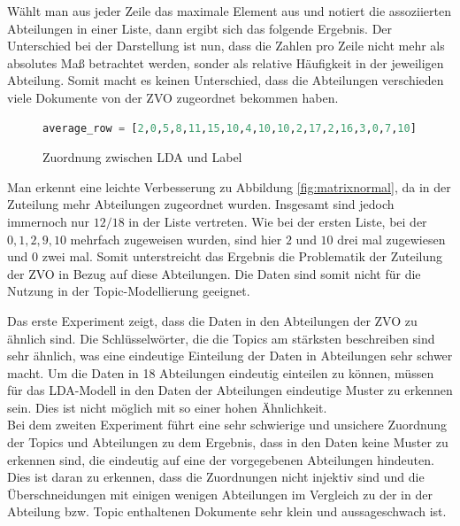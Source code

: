 \documentclass[german,version-2020-11]{uzl-thesis}
\begin{document}
Wählt man aus jeder Zeile das maximale Element aus und notiert die assoziierten Abteilungen in einer Liste, dann ergibt sich das folgende Ergebnis. Der Unterschied bei der Darstellung ist nun, dass die Zahlen pro Zeile nicht mehr als absolutes Maß betrachtet werden, sonder als relative Häufigkeit in der jeweiligen Abteilung. Somit macht es keinen Unterschied, dass die Abteilungen verschieden viele Dokumente von der ZVO zugeordnet bekommen haben. \\

\begin{figure}[h]
\begin{center}
\begin{lstlisting}[language=Python]
average_row = [2,0,5,8,11,15,10,4,10,10,2,17,2,16,3,0,7,10]
\end{lstlisting}
\caption{Zuordnung zwischen LDA und Label} 
\end{center}
\end{figure}

Man erkennt eine leichte Verbesserung zu Abbildung \ref{fig:matrixnormal}, da in der Zuteilung mehr Abteilungen zugeordnet wurden. Insgesamt sind jedoch immernoch nur $12/18$ in der Liste vertreten. Wie bei der ersten Liste, bei der  $ 0,1,2,9,10 $ mehrfach zugeweisen wurden, sind hier $2$ und $10$ drei mal zugewiesen und $0$ zwei mal. Somit unterstreicht das Ergebnis die Problematik der Zuteilung der ZVO in Bezug auf diese Abteilungen. Die Daten sind somit nicht für die Nutzung in der Topic-Modellierung geeignet.


Das erste Experiment zeigt, dass die Daten in den Abteilungen der ZVO zu ähnlich sind. Die Schlüsselwörter, die die Topics am stärksten beschreiben sind sehr ähnlich, was eine eindeutige Einteilung der Daten in Abteilungen sehr schwer macht. Um die Daten in 18 Abteilungen eindeutig einteilen zu können, müssen für das LDA-Modell in den Daten der Abteilungen eindeutige Muster zu erkennen sein. Dies ist nicht möglich mit so einer hohen Ähnlichkeit.\\


Bei dem zweiten Experiment führt eine sehr schwierige und unsichere Zuordnung der Topics und Abteilungen zu dem Ergebnis, dass in den Daten keine Muster zu erkennen sind, die eindeutig auf eine der vorgegebenen Abteilungen hindeuten. Dies ist daran zu erkennen, dass die Zuordnungen nicht injektiv sind und die Überschneidungen mit einigen wenigen Abteilungen im Vergleich zu der in der Abteilung bzw. Topic enthaltenen Dokumente sehr klein und aussageschwach ist. 
\end{document}
